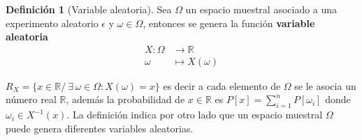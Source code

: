 \documentclass[
  10pt,
]{krantz}
\theoremstyle{definition}
\newtheorem{definition}{Definición}[chapter]
\theoremstyle{definition}
\theoremstyle{definition}
\theoremstyle{definition}
\theoremstyle{remark}
\begin{document}
\begin{definition}[Variable aleatoria]
\protect\hypertarget{def:unnamed-chunk-10}{}{\label{def:unnamed-chunk-10} {} }Sea \(\Omega\) un espacio muestral asociado a una experimento aleatorio \(\epsilon\) y \(\omega\in\Omega\), entonces se genera la función \textbf{variable aleatoria}
\begin{align*}
  X:\Omega&\longrightarrow \mathbb{R}\\
  \omega&\longmapsto X(\omega)
\end{align*}
\end{definition}
\(R_{X}=\{x\in \mathbb {R} /\ \exists \,\omega \in \Omega :X(\omega )=x\}\)
es decir a cada elemento de \(\Omega\) se le asocia un número real \(\mathbb{R}\), además la probabilidad de \(x\in \mathbb{R}\) es \(P[x]= \sum^{n}_{i=1}P\left[\omega_i\right]\) donde \(\omega_i\in X^{-1}(x)\). La definición indica por otro lado que un espacio muestral \(\Omega\) puede genera diferentes variables aleatorias.
\end{document}
